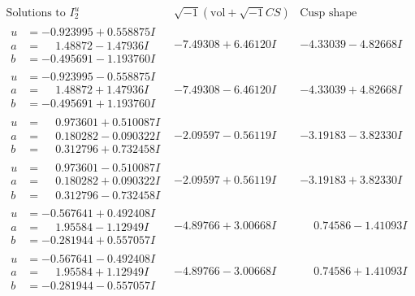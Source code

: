 \documentclass[1p]{elsarticle_modified}
\theoremstyle{definition}
\newcommand{\I}{\sqrt{-1}}
\begin{document}
$$\begin{array}{c|c|c}  
\text{Solutions to }I^u_{2}& \I (\text{vol} + \sqrt{-1}CS) & \text{Cusp shape}\\
 \hline 
\begin{aligned}
u &= -0.923995 + 0.558875 I \\
a &= \phantom{-}1.48872 - 1.47936 I \\
b &= -0.495691 - 1.193760 I\end{aligned}
 & -7.49308 + 6.46120 I & -4.33039 - 4.82668 I \\ \hline\begin{aligned}
u &= -0.923995 - 0.558875 I \\
a &= \phantom{-}1.48872 + 1.47936 I \\
b &= -0.495691 + 1.193760 I\end{aligned}
 & -7.49308 - 6.46120 I & -4.33039 + 4.82668 I \\ \hline\begin{aligned}
u &= \phantom{-}0.973601 + 0.510087 I \\
a &= \phantom{-}0.180282 - 0.090322 I \\
b &= \phantom{-}0.312796 + 0.732458 I\end{aligned}
 & -2.09597 - 0.56119 I & -3.19183 - 3.82330 I \\ \hline\begin{aligned}
u &= \phantom{-}0.973601 - 0.510087 I \\
a &= \phantom{-}0.180282 + 0.090322 I \\
b &= \phantom{-}0.312796 - 0.732458 I\end{aligned}
 & -2.09597 + 0.56119 I & -3.19183 + 3.82330 I \\ \hline\begin{aligned}
u &= -0.567641 + 0.492408 I \\
a &= \phantom{-}1.95584 - 1.12949 I \\
b &= -0.281944 + 0.557057 I\end{aligned}
 & -4.89766 + 3.00668 I & \phantom{-}0.74586 - 1.41093 I \\ \hline\begin{aligned}
u &= -0.567641 - 0.492408 I \\
a &= \phantom{-}1.95584 + 1.12949 I \\
b &= -0.281944 - 0.557057 I\end{aligned}
 & -4.89766 - 3.00668 I & \phantom{-}0.74586 + 1.41093 I \\ \hline\begin{aligned}

\end{aligned}
\end{array}$$
\end{document}
